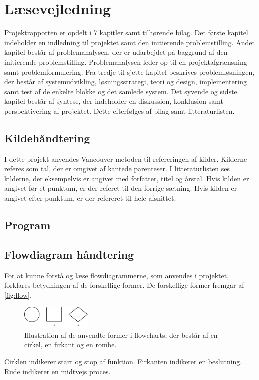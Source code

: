 \section*{Læsevejledning}
Projektrapporten er opdelt i 7 kapitler samt tilhørende bilag. Det første kapitel indeholder en indledning til projektet samt den initierende problemstilling. Andet kapitel består af problemanalysen, der er udarbejdet på baggrund af den initierende problemstilling. Problemanalysen leder op til en projektafgrænsning samt problemformulering. Fra tredje til sjette kapitel beskrives problemløsningen, der består af systemudvikling, løsningsstrategi, teori og design, implementering samt test af de enkelte blokke og det samlede system. Det syvende og sidste kapitel består af syntese, der indeholder en diskussion, konklusion samt perspektivering af projektet. Dette efterfølges af bilag samt litteraturlisten. 


\subsection*{Kildehåndtering}
I dette projekt anvendes Vancouver-metoden til refereringen af kilder. Kilderne referes som tal, der er omgivet af kantede parenteser. I litteraturlisten ses kilderne, der eksempelvis er angivet med forfatter, titel og årstal. Hvis kilden er angivet før et punktum, er der referet til den forrige sætning. Hvis kilden er angivet efter punktum, er der refereret til hele afsnittet.

\subsection*{Program} 


\subsection*{Flowdiagram håndtering} \label{sec:flowhaandtering}
For at kunne forstå og læse flowdiagrammerne, som anvendes i projektet, forklares betydningen af de forskellige former. De forskellige former fremgår af \autoref{fig:flow}.

\begin{figure}[H]
\centering
\includegraphics[width=0.3\textwidth]{figures/flow}
\caption{Illustration af de anvendte former i flowcharts, der består af en cirkel, en firkant og en rombe.}
\label{fig:flow}
\end{figure}

\noindent
Cirklen indikerer start og stop af funktion. Firkanten indikerer en beslutning. Rude indikerer en midtvejs proces.